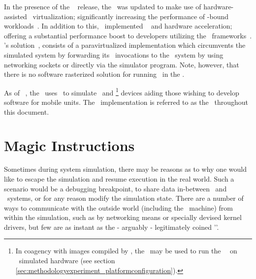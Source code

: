 In the presence of the \dvttermandroid\  release, the \dvttermandroidsdk\ was updated to make use of hardware-assisted \dvttermxeightysix\ virtualization; significantly increasing the performance of \dvttermcpu -bound workloads~.
In addition to this, \dvttermgoogle\ implemented \dvttermopengles\  and  hardware acceleration; offering a substantial performance boost to developers utilizing the \dvttermopengles\ frameworks~.
\dvttermgoogle 's solution~, consists of a paravirtualized implementation which circumvents the simulated system by forwarding its \dvttermopengles\ invocations to the \dvttermhost\ system by using networking sockets or directly via the simulator program.
Note, however, that there is no software rasterized solution for running \dvttermopenglestwopointo\ in the \dvttermandroidemulator .

As of \dvttermandroid\ , the \dvttermandroidemulator\ uses \dvttermqemu\ to simulate \dvttermarm\ and \dvttermxeightysix \footnote{In coagency with images compiled by \dvttermintel , the \dvttermandroidemulator\ may be used to run the \dvttermandroid\ \dvttermos\ on \dvttermxeightysix\ simulated hardware (see section \ref{sec:methodologyexperiment_platformconfiguration}).} devices aiding those wishing to develop software for mobile units.
The \dvttermandroidemulator\ implementation is referred to as the \dvttermreferencesolution\ throughout this document.

\section{Magic Instructions}
\label{sec:backgroundandrelatedwork_magicinstructions}
Sometimes during system simulation, there may be reasons as to why one would like to escape the simulation and resume execution in the real world.
Such a scenario would be a debugging breakpoint, to share data in-between \dvttermtarget\ and \dvttermhost\ systems, or for any reason modify the simulation state.
There are a number of ways to communicate with the outside world (including the \dvttermhost\ machine) from within the simulation, such as by networking means or specially devised kernel drivers, but few are as instant as the - arguably - legitimately coined '\dvttermmagicinstruction '.

